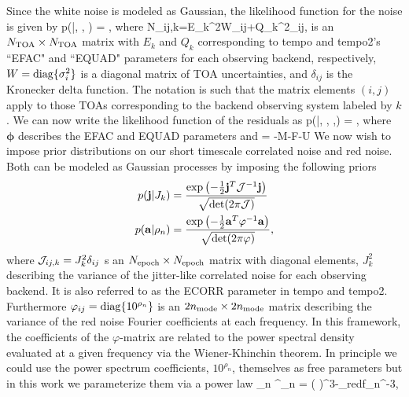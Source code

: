 {Since the white noise is modeled as Gaussian, the likelihood function for the noise is given by
\be
p(|\boldsymbol{\epsilon}, , ) = ,
\ee
where 
\be
N_{ij,k}=E_{k}^2W_{ij}+Q_{k}^2\delta_{ij},
\ee
is an $N_{\rm TOA}\times N_{\rm TOA}$ matrix with $E_{k}$ and $Q_{k}$
corresponding to {\sc tempo} and {\sc tempo2}'s ``EFAC" and ``EQUAD" parameters for each observing backend, respectively, $W={\rm diag}\{\sigma_i^2\}$ is a diagonal matrix of TOA uncertainties, and $\delta_{ij}$ is the Kronecker delta function. The notation is such that the matrix elements $(i,j)$ apply to those TOAs corresponding to the backend observing system labeled by $k$. We can now write the likelihood function of the residuals as
\be
p(\delta{}|\boldsymbol{\epsilon}, , ,\boldsymbol{\phi}) = ,
\ee
where $\boldsymbol{\phi}$ describes the EFAC and EQUAD parameters and 
\be
{} = \delta{}-M\boldsymbol{\epsilon}-F-U
\ee
We now wish to impose prior distributions on our short timescale correlated noise and red noise. Both can be modeled as Gaussian processes by imposing the following priors
\begin{align}
p(\mathbf{j}|J_{k}) &= \frac{\exp\left( -\frac{1}{2}\mathbf{j}^{T}\mathcal{J}^{-1}\mathbf{j} \right)}{\sqrt{\det(2\pi\mathcal{J})}}\\
p(\mathbf{a}|\rho_{n}) &= \frac{\exp\left( -\frac{1}{2}\mathbf{a}^{T}\varphi^{-1}\mathbf{a} \right)}{\sqrt{\det(2\pi\varphi)}},
\end{align}
where $\mathcal{J}_{ij,k} = J_{k}^{2}\delta_{ij}$ s an $N_{\rm epoch}\times N_{\rm
epoch}$ matrix with diagonal elements, $J_{k}^{2}$ describing the variance of
the jitter-like correlated noise for each observing backend. It is also
referred to as the ECORR parameter in {\sc tempo} and {\sc tempo2}. Furthermore $\varphi_{ij} = {\rm diag}\{10^{\rho_{n}}\}$ is an $2n_{\rm mode}\times 2n_{\rm mode}$ matrix describing the variance of the red noise Fourier coefficients at each frequency. In this framework, the coefficients of the $\varphi$-matrix are related to the power spectral density evaluated at a given frequency via the Wiener-Khinchin theorem. In principle we could use the power spectrum coefficients, $10^{\rho_{n}}$, themselves as free parameters but in this work we parameterize them via a power law
\be
\varphi_{n} ^{\rho_{n}} = \left(  \right)^{3-\gamma_{\rm red}}f_{n}^{-3},
}
